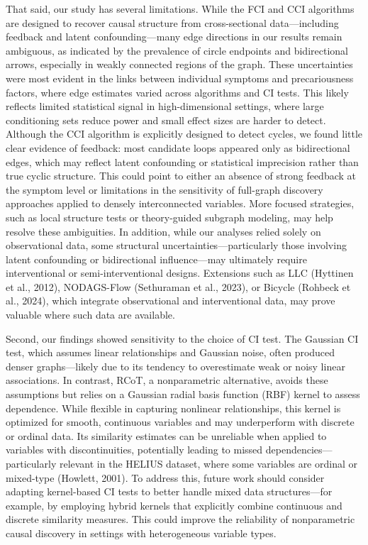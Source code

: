 \documentclass[
]{article}
\begin{document}
That said, our study has several limitations. While the FCI and CCI
algorithms are designed to recover causal structure from cross-sectional
data---including feedback and latent confounding---many edge directions
in our results remain ambiguous, as indicated by the prevalence of
circle endpoints and bidirectional arrows, especially in weakly
connected regions of the graph. These uncertainties were most evident in
the links between individual symptoms and precariousness factors, where
edge estimates varied across algorithms and CI tests. This likely
reflects limited statistical signal in high-dimensional settings, where
large conditioning sets reduce power and small effect sizes are harder
to detect. Although the CCI algorithm is explicitly designed to detect
cycles, we found little clear evidence of feedback: most candidate loops
appeared only as bidirectional edges, which may reflect latent
confounding or statistical imprecision rather than true cyclic
structure. This could point to either an absence of strong feedback at
the symptom level or limitations in the sensitivity of full-graph
discovery approaches applied to densely interconnected variables. More
focused strategies, such as local structure tests or theory-guided
subgraph modeling, may help resolve these ambiguities. In addition,
while our analyses relied solely on observational data, some structural
uncertainties---particularly those involving latent confounding or
bidirectional influence---may ultimately require interventional or
semi-interventional designs. Extensions such as LLC (Hyttinen et al.,
2012), NODAGS-Flow (Sethuraman et al., 2023), or Bicycle (Rohbeck et
al., 2024), which integrate observational and interventional data, may
prove valuable where such data are available.

Second, our findings showed sensitivity to the choice of CI test. The
Gaussian CI test, which assumes linear relationships and Gaussian noise,
often produced denser graphs---likely due to its tendency to
overestimate weak or noisy linear associations. In contrast, RCoT, a
nonparametric alternative, avoids these assumptions but relies on a
Gaussian radial basis function (RBF) kernel to assess dependence. While
flexible in capturing nonlinear relationships, this kernel is optimized
for smooth, continuous variables and may underperform with discrete or
ordinal data. Its similarity estimates can be unreliable when applied to
variables with discontinuities, potentially leading to missed
dependencies---particularly relevant in the HELIUS dataset, where some
variables are ordinal or mixed-type (Howlett, 2001). To address this,
future work should consider adapting kernel-based CI tests to better
handle mixed data structures---for example, by employing hybrid kernels
that explicitly combine continuous and discrete similarity measures.
This could improve the reliability of nonparametric causal discovery in
settings with heterogeneous variable types.
\end{document}
